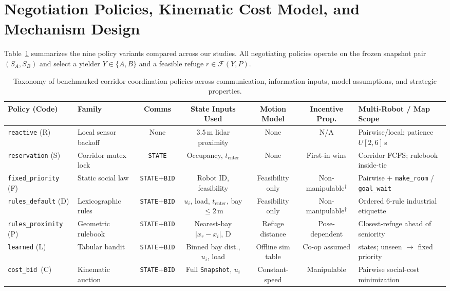 \documentclass[letterpaper,journal]{IEEEtran}
\newcommand{\cb}{\texttt{cost\_bid}}
\begin{document}
\section{Negotiation Policies, Kinematic Cost Model, and Mechanism Design}\label{sec:pol}

Table~\ref{tab:taxonomy} summarizes the nine policy variants compared across our studies. All negotiating policies operate on the frozen snapshot pair $(S_A, S_B)$ and select a yielder $Y\in\{A,B\}$ and a feasible refuge $r\in\mathcal{F}(Y,P)$.

\begin{table}[t]\centering
\caption{Taxonomy of benchmarked corridor coordination policies across communication, information inputs, model assumptions, and strategic properties.}
\label{tab:taxonomy}
{\footnotesize\setlength{\tabcolsep}{2.9pt}
\begin{tabular}{@{}llcccc>{\raggedright\arraybackslash}p{}@{}}\toprule
Policy (Code) & Family & Comms & State Inputs Used & Motion Model & Incentive Prop. & Multi-Robot / Map Scope \\\midrule
\texttt{reactive} (R) & Local sensor backoff & None & $3.5$\,m lidar proximity & None & N/A & Pairwise/local; patience $U[2,6]$\,s \\
\texttt{reservation} (S) & Corridor mutex lock & \texttt{STATE} & Occupancy, $t_{\mathrm{enter}}$ & None & First-in wins & Corridor FCFS; rulebook inside-tie \\
\texttt{fixed\_priority} (F) & Static social law & \texttt{STATE}+\texttt{BID} & Robot ID, feasibility & Feasibility only & Non-manipulable$^\dagger$ & Pairwise + \texttt{make\_room} / \texttt{goal\_wait} \\
\texttt{rules\_default} (D) & Lexicographic rules & \texttt{STATE}+\texttt{BID} & $u_i$, load, $t_{\mathrm{enter}}$, bay $\le 2$\,m & Feasibility only & Non-manipulable$^\dagger$ & Ordered 6-rule industrial etiquette \\
\texttt{rules\_proximity} (P) & Geometric rulebook & \texttt{STATE}+\texttt{BID} & Nearest-bay $|x_r - x_i|$, D & Refuge distance & Pose-dependent & Closest-refuge ahead of seniority \\
\texttt{learned} (L) & Tabular bandit & \texttt{STATE}+\texttt{BID} & Binned bay dist., $u_i$, load & Offline sim table & Co-op assumed & 93 states; unseen $\to$ fixed priority \\
\cb\ (C) & Kinematic auction & \texttt{STATE}+\texttt{BID} & Full \texttt{Snapshot}, $u_i$ & Constant-speed & Manipulable & Pairwise social-cost minimization \\

\end{tabular}}
\end{table}
\end{document}
